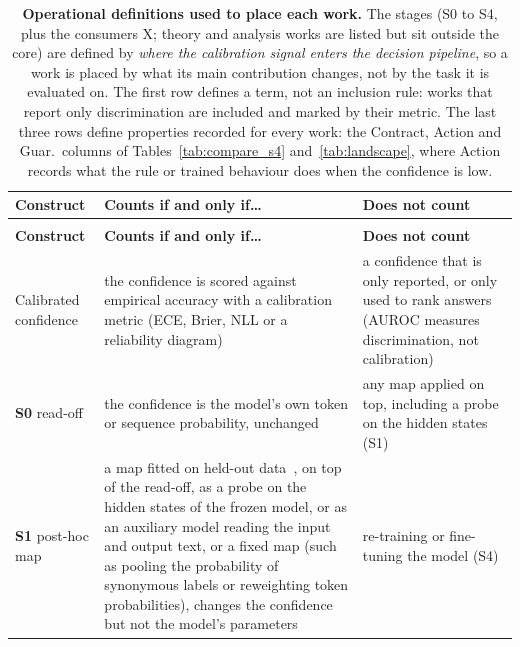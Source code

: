 {\footnotesize\renewcommand{\arraystretch}{1.18}
\begin{longtable}{@{}>{\raggedright\arraybackslash}p{}
                   >{\raggedright\arraybackslash}p{}
                   >{\raggedright\arraybackslash}p{}@{}}
\caption{\textbf{Operational definitions used to place each work.} The stages (S0 to S4, plus the consumers X; theory and analysis works are listed but sit outside the core) are defined by
\emph{where the calibration signal enters the decision pipeline}, so a work is placed by what its main contribution
changes, not by the task it is evaluated on. The first row defines a term, not an inclusion rule: works that report
only discrimination are included and marked by their metric. The last three rows define properties recorded for every work: the Contract, Action and Guar.\ columns
of Tables~\ref{tab:compare_s4} and~\ref{tab:landscape}, where Action records what the rule or trained behaviour does when the confidence is low.}
\label{tab:definitions}\\
\toprule \textbf{Construct} & \textbf{Counts if and only if\ldots} & \textbf{Does not count} \\ \midrule \endfirsthead
\multicolumn{3}{@{}l}{\emph{Table~\thetable, continued}}\\ \toprule \textbf{Construct} & \textbf{Counts if and only if\ldots} & \textbf{Does not count} \\ \midrule \endhead
\bottomrule \endfoot
Calibrated confidence & the confidence is scored against empirical accuracy with a calibration metric (ECE, Brier, NLL or a reliability diagram) & a confidence that is only reported, or only used to rank answers (AUROC measures discrimination, not calibration) \\
\midrule
\textcolor{stS0txt}{\textbf{S0}} read-off & the confidence is the model's own token or sequence probability, unchanged & any map applied on top, including a probe on the hidden states (S1) \\
\textcolor{stS1txt}{\textbf{S1}} post-hoc map & a map fitted on held-out data~\citep{guo2017calibration}, on top of the read-off, as a probe on the hidden states of the frozen model, or as an auxiliary model reading the input and output text, or a fixed map (such as pooling the probability of synonymous labels or reweighting token probabilities), changes the confidence but not the model's parameters & re-training or fine-tuning the model (S4) \\

\end{longtable}}
